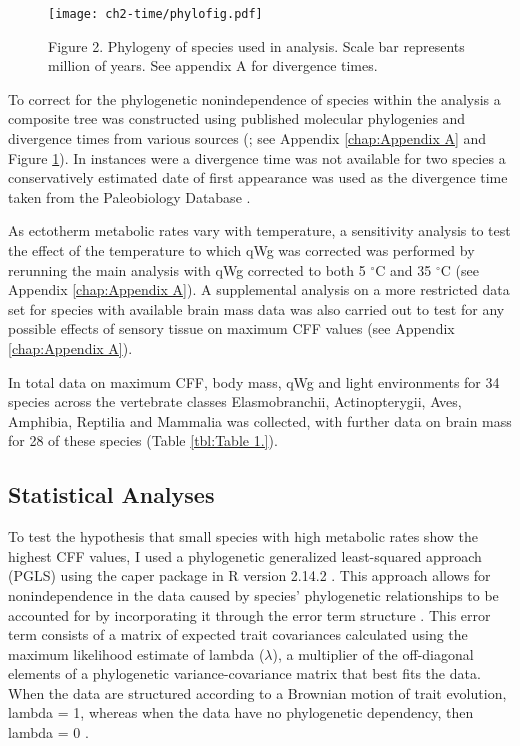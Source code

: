 \begin{figure}[h!]
  \centering
  \texttt{[image: ch2-time/phylofig.pdf]}
  \caption*{Figure 2. Phylogeny of species used in analysis. Scale bar represents million of years. See appendix A for divergence times.}
  \label{fig:Figure 2.}
\end{figure}


To correct for the phylogenetic nonindependence of species within the analysis a composite tree was constructed using published molecular phylogenies and divergence times from various sources (\cite{schoch1985preliminary,janossy2011pleistocene,mercer2003effects,hedges2006timetree,wiens2006does,benton2007paleontological,murphy2007using,brown2008strong,li2008optimal,naro2008evolutionary,albert2009effect,lim2010phylogeny,little2010evolutionary,perelman2011molecular}; see Appendix \ref{chap:Appendix A} and Figure \ref{fig:Figure 2.}). In instances were a divergence time was not available for two species a conservatively estimated date of first appearance was used as the divergence time taken from the Paleobiology Database \citep{alroy2008phanerozoic}.


As ectotherm metabolic rates vary with temperature, a sensitivity analysis to test the effect of the temperature to which qWg was corrected was performed by rerunning the main analysis with qWg corrected to both 5 $^{\circ}$C and 35 $^{\circ}$C (see Appendix \ref{chap:Appendix A}). A supplemental analysis on a more restricted data set for species with available brain mass data was also carried out to test for any possible effects of sensory tissue on maximum CFF values (see Appendix \ref{chap:Appendix A}).

In total data on maximum CFF, body mass, qWg and light environments for 34 species across the vertebrate classes Elasmobranchii, Actinopterygii, Aves, Amphibia, Reptilia and Mammalia was collected, with further data on brain mass for 28 of these species (Table \ref{tbl:Table 1.}).

\subsection{Statistical Analyses}
To test the hypothesis that small species with high metabolic rates show the highest CFF values, I used a phylogenetic generalized least-squared approach (PGLS) using the caper package \citep{orme2011caper} in R version 2.14.2 \citep{RCran}. This approach allows for nonindependence in the data caused by species' phylogenetic relationships to be accounted for by incorporating it through the error term structure \citep{pagel1999inferring,rohlf2001comparative}. This error term consists of a matrix of expected trait covariances calculated using the maximum likelihood estimate of lambda ($\lambda$), a multiplier of the off-diagonal elements of a phylogenetic variance-covariance matrix that best fits the data. When the data are structured according to a Brownian motion of trait evolution, lambda = 1, whereas when the data have no phylogenetic dependency, then lambda = 0 \citep{pagel1999inferring}.

